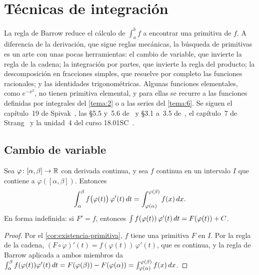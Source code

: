 \chapter{Técnicas de integración}
\label{tema:3}

La regla de Barrow reduce el cálculo de $\int_a^b f$ a encontrar una primitiva de $f$. A diferencia de la derivación, que sigue reglas mecánicas, la búsqueda de primitivas es un arte con unas pocas herramientas: el cambio de variable, que invierte la regla de la cadena; la integración por partes, que invierte la regla del producto; la descomposición en fracciones simples, que resuelve por completo las funciones racionales; y las identidades trigonométricas. Algunas funciones elementales, como $e^{-x^{2}}$, no tienen primitiva elemental, y para ellas se recurre a las funciones definidas por integrales del \cref{tema:2} o a las series del \cref{tema:6}. Se siguen el capítulo~19 de Spivak~\cite{spivak}, las §5.5 y~5.6 de~\cite{openstax1} y §3.1 a~3.5 de~\cite{openstax2}, el capítulo~7 de Strang~\cite{strang} y la unidad~4 del curso 18.01SC~\cite{mit1801}.

\section{Cambio de variable}

\begin{teorema}\label{teo:sustitucion}
Sea $\varphi\colon[\alpha,\beta]\to\mathbb{R}$ con derivada continua, y sea $f$ continua en un intervalo $I$ que contiene a $\varphi([\alpha,\beta])$. Entonces
\[
\int_{\alpha}^{\beta}f\bigl(\varphi(t)\bigr)\,\varphi'(t)\mathop{}\!d t=\int_{\varphi(\alpha)}^{\varphi(\beta)}f(x)\mathop{}\!d x .
\]
En forma indefinida: si $F'=f$, entonces $\int f(\varphi(t))\,\varphi'(t)\mathop{}\!d t=F(\varphi(t))+C$.
\end{teorema}

\begin{proof}
Por el \cref{cor:existencia-primitiva}, $f$ tiene una primitiva $F$ en $I$. Por la regla de la cadena, $(F\circ\varphi)'(t)=f(\varphi(t))\,\varphi'(t)$, que es continua, y la regla de Barrow aplicada a ambos miembros da
$\int_\alpha^\beta f(\varphi(t))\varphi'(t)\mathop{}\!d t=F(\varphi(\beta))-F(\varphi(\alpha))=\int_{\varphi(\alpha)}^{\varphi(\beta)}f(x)\mathop{}\!d x$.
\end{proof}

